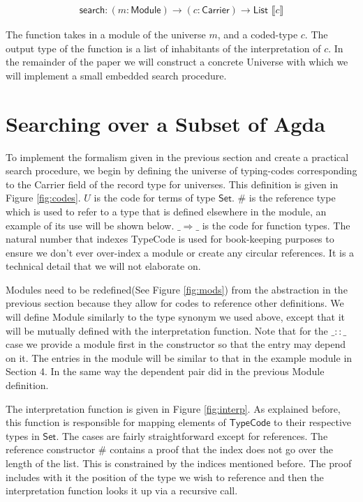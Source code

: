 \documentclass[acmsmall,review,authorversion]{acmart}
\newcommand{\term}[1]{\textsf{#1}}
\newcommand{\type}[1]{\textsf{#1}}
\newcommand{\Carrier}{\term{Carrier}}
\newcommand{\Set}{\type{Set}}
\newcommand{\Interp}[1]{\llbracket #1 \rrbracket}
\newcommand{\?}{\stackrel{?}{\approx}}
\newcommand{\search}{\term{search}}
\begin{document}
$$
\begin{array}{l}
  \search : (m : \textsf{Module})\rightarrow (c : \Carrier) \rightarrow \textsf{List }\Interp{c}
\end{array}
$$

The function takes in a module of the universe $m$, and a coded-type $c$. The
output type of the function is a list of inhabitants of the interpretation of
$c$. In the remainder of the paper we will construct a concrete Universe with
which we will implement a small embedded search procedure.

\section{Searching over a Subset of Agda} 

To implement the formalism given in the previous section and create a practical
search procedure, we begin by defining the universe of typing-codes
corresponding to the \textsf{Carrier} field of the record type for universes.
This definition is given in Figure \ref{fig:codes}. $U$ is the code for terms of
type $\Set$. $\#$ is the reference type which is used to refer to a type that is
defined elsewhere in the module, an example of its use will be shown below.
$\_\Rightarrow\_$ is the code for function types. The natural number that
indexes \textsf{TypeCode} is used for book-keeping purposes to ensure we don't
ever over-index a module or create any circular references. It is a technical
detail that we will not elaborate on.

Modules need to be redefined(See Figure \ref{fig:mods}) from the abstraction in
the previous section because they allow for codes to reference other
definitions. We will define Module similarly to the type synonym we used above,
except that it will be mutually defined with the interpretation function. Note
that for the $\_::\_$ case we provide a module first in the constructor so that
the entry may depend on it. The entries in the module will be similar to that in
the example module in Section 4. In the same way the dependent pair
did in the previous Module definition.

The interpretation function is given in Figure \ref{fig:interp}. As explained
before, this function is responsible for mapping elements of $\textsf{TypeCode}$
to their respective types in $\Set$. The cases are fairly straightforward except
for references. The reference constructor $\#$ contains a proof that the index
does not go over the length of the list. This is constrained by the indices
mentioned before. The proof includes with it the position of the type we wish to
reference and then the interpretation function looks it up via a recursive call. 
\end{document}

